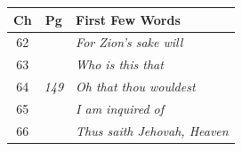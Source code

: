\documentclass{article}
\newlength{\minipageheight}
\newlength{\minipagewidth}
\begin{document}
%
%
\begin{minipage}[r][\minipageheight][t]{\minipagewidth}%
    \begin{longtable}{ccl}
        \textbf{Ch} & \textbf{Pg}    & \textbf{First Few Words}            \\%
        \hline%
        \endfirsthead%
        62          &                & \textit{For Zion’s sake will}       \\
        63          &                & \textit{Who is this that}           \\
        64          & \textit{149}   & \textit{Oh that thou wouldest}      \\
        65          &                & \textit{I am inquired of}           \\
        66          &                & \textit{Thus saith Jehovah, Heaven} \\


\end{longtable}
\end{minipage}
\end{document}
